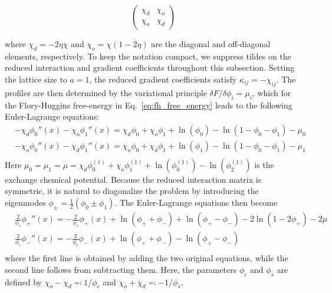 \documentclass[12pt]{article}
\begin{document}
\[
    \begin{pmatrix}
         \chi_d & \chi_o \\
        \chi_o & \chi_d
    \end{pmatrix}
\]

where \(\chi_d = -2\eta\chi\) and \(\chi_o=\chi(1-2\eta)\) are the diagonal and off-diagonal elements, respectively. To keep the notation compact, we suppress tildes on the reduced interaction and gradient coefficients throughout this subsection.
Setting the lattice size to \(a = 1\), the reduced gradient coefficients satisfy \(\kappa_{ij} = -\chi_{ij}\).
The profiles are then determined by the variational principle \(\delta F/\delta \phi_i = \mu_i\), which for the Flory-Huggins free-energy in Eq.~\eqref{eq:fh_free_energy} leads to the following Euler-Lagrange equations:
\[
\begin{aligned}
    &-\chi_d \phi_0''(x) - \chi_o \phi_1''(x) = \chi_d \phi_0 + \chi_o \phi_1 + \ln(\phi_0) - \ln(1-\phi_0-\phi_1)-\mu_0\\
    &-\chi_o \phi_0''(x) - \chi_d  \phi_1''(x) = \chi_o \phi_0 + \chi_d \phi_1 + \ln(\phi_1) - \ln(1-\phi_0-\phi_1)-\mu_1\\
\end{aligned}
\]
Here \(\mu_0=\mu_1=\mu=\chi_d\phi_0^{(1)} + \chi_o \phi_1^{(1)} + \ln(\phi_0^{(1)}) - \ln(\phi_2^{(1)})\) is the exchange chemical potential.
Because the reduced interaction matrix is symmetric, it is natural to diagonalize the problem by introducing the eigenmodes \(\phi_\pm = \frac{1}{2}(\phi_0 \pm \phi_1)\). The Euler-Lagrange equations then become
\begin{equation}
\begin{aligned}
    &\frac{2}{\phi_s} \phi_+''(x) = -\frac{2}{\phi_s}\phi_+(x) + \ln(\phi_+ + \phi_-) + \ln(\phi_+ - \phi_-) - 2 \ln(1-2\phi_+) - 2\mu \\
    &\frac{2}{\phi_c} \phi_-''(x) = -\frac{2}{\phi_c}\phi_-(x) + \ln(\phi_+ + \phi_-) - \ln(\phi_+ - \phi_-)\\
\end{aligned}
\label{eq:el_symmetric}
\end{equation}
where the first line is obtained by adding the two original equations, while the second line follows from subtracting them. Here, the parameters \(\phi_c\) and \(\phi_s\) are defined by \(\chi_o - \chi_d \eqcolon 1/\phi_c\) and \(\chi_o + \chi_d \eqcolon -1/\phi_s\).\\
\end{document}
